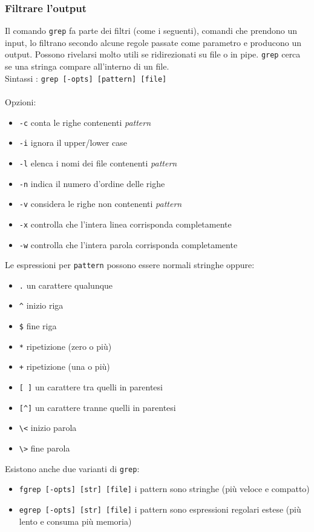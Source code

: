 \documentclass[a4paper, 10pt]{article}
\begin{document}
\subsubsection{Filtrare l'output} Il comando \verb|grep| fa parte dei filtri (come i seguenti), comandi che prendono un input, lo filtrano secondo alcune regole passate come parametro e producono un output. Possono rivelarsi molto utili se ridirezionati su file o in pipe. \verb|grep| cerca se una stringa compare all'interno di un file. \\
Sintassi : \verb|grep [-opts] [pattern] [file]| \\ \\
Opzioni:
\begin{itemize}
\item \verb|-c| conta le righe contenenti \textit{pattern}
\item \verb|-i| ignora il upper/lower case
\item \verb|-l| elenca i nomi dei file contenenti \textit{pattern}
\item \verb|-n| indica il numero d'ordine delle righe
\item \verb|-v| considera le righe non contenenti \textit{pattern}
\item \verb|-x| controlla che l'intera linea corrisponda completamente
\item \verb|-w| controlla che l'intera parola corrisponda completamente
\end{itemize}
Le espressioni per \verb|pattern| possono essere normali stringhe oppure:\begin{itemize}
\item \verb|.| un carattere qualunque
\item \verb|^| inizio riga
\item \verb|$| fine riga
\item \verb|*| ripetizione (zero o più) 
\item \verb|+| ripetizione (una o più)
\item \verb|[ ]| un carattere tra quelli in parentesi
\item \verb|[^]| un carattere tranne quelli in parentesi
\item \verb|\<| inizio parola
\item \verb|\>| fine parola
\end{itemize}
Esistono anche due varianti di \verb|grep|:
\begin{itemize}
\item \verb|fgrep [-opts] [str] [file]| i pattern sono stringhe (più veloce e compatto)
\item \verb|egrep [-opts] [str] [file]| i pattern sono espressioni regolari estese (più lento e consuma più memoria)
\end{itemize}
\end{document}
